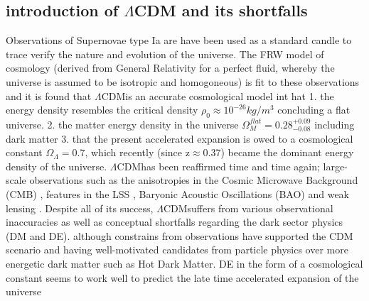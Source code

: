 \documentclass[a4paper,fleqn,usenatbib]{mnras}
\def \lcdm{$\Lambda$CDM}
\begin{document}
\subsection{introduction of $\Lambda$CDM and its shortfalls}
Observations of Supernovae type Ia are have been used as a standard candle to trace verify the nature and evolution of the universe. The FRW model of cosmology (derived from General Relativity for a perfect fluid, whereby the universe is assumed to be isotropic and homogoneous) is fit to these observations and it is found that \lcdm is an accurate cosmological model int hat 1. the energy density resembles the critical density $\rho_{0}\approx 10^{-26}kg/m^{3}$ concluding a flat universe. 2. the matter energy density in the universe $\Omega_{M}^{flat}=0.28^{+0.09}_{-0.08}$ including dark matter 3. that the present accelerated expansion is owed to a cosmological constant $\Omega_{\Lambda}=0.7$, which recently (since z$\approx$0.37) became the dominant energy density of the universe. \citep{Riess_98,Perlmutter_99}
\lcdm has been reaffirmed time and time again; large-scale observations such as the anisotropies in the Cosmic Microwave Background (CMB) \citep{Bennett_13,Plank_14b,Plank_16}, features in the LSS \citep{Abazajian_09}, Baryonic Acoustic Oscillations (BAO) \citep{Beutler_11} and weak lensing \citep{Kilbinger_13}.
Despite all of its success, \lcdm suffers from various observational inaccuracies as well as conceptual shortfalls regarding the dark sector physics (DM and DE). although constrains from observations have supported the CDM scenario \citep{Bertone_05,Petraki_13} and having well-motivated candidates from particle physics over more energetic dark matter such as Hot Dark Matter. DE in the form of a cosmological constant seems to work well to predict the late time accelerated expansion of the universe \citep{Suzuki_12}
\end{document}
